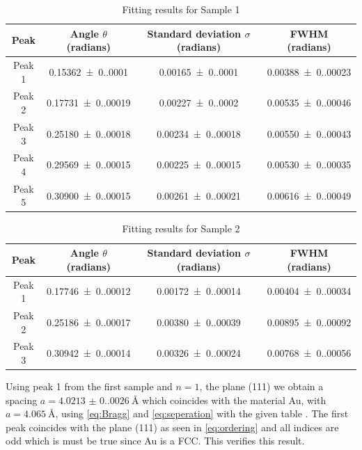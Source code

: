 \begin{table}[H]
    \centering
    \caption{Fitting results for Sample 1}
    \begin{tabular}{cccc}
    \toprule
    Peak & Angle $\theta$ (radians) & Standard deviation $\sigma$ (radians) & FWHM (radians) \\
    \midrule
    Peak 1 & \num{0.15362(0.00010)}{} & \num{0.00165(0.00010)} & \num{0.00388(0.00023)}{} \\
    Peak 2 & \num{0.17731(0.00019)}{} & \num{0.00227(0.00020)}{} & \num{0.00535(0.00046)}{} \\
    Peak 3 & \num{0.25180(0.00018)}{} & \num{0.00234(0.00018)}{} & \num{0.00550(0.00043)}{} \\
    Peak 4 & \num{0.29569(0.00015)}{} & \num{0.00225(0.00015)}{} & \num{0.00530(0.00035)}{} \\
    Peak 5 & \num{0.30900(0.00015)}{} & \num{0.00261(0.00021)}{} & \num{0.00616(0.00049)}{} \\
    \bottomrule
    \end{tabular}
    \label{tab:sample1}
\end{table}

\begin{table}[H]
    \centering
    \caption{Fitting results for Sample 2}
    \begin{tabular}{cccc}
    \toprule
    Peak & Angle $\theta$ (radians) & Standard deviation $\sigma$ (radians) & FWHM (radians) \\
    \midrule
    Peak 1 & \num{0.17746(0.00012)}{} & \num{0.00172(0.00014)}{} & \num{0.00404(0.00034)}{} \\
    Peak 2 & \num{0.25186(0.00017)}{} & \num{0.00380(0.00039)}{} & \num{0.00895(0.00092)}{} \\
    Peak 3 & \num{0.30942(0.00014)}{} & \num{0.00326(0.00024)}{} & \num{0.00768(0.00056)}{} \\
    \bottomrule
    \end{tabular}
    \label{tab:sample2}
\end{table}


Using peak 1 from the first sample and $n=1$, the plane (111) we obtain a spacing $a=\SI{4.0213(0.0026)}{\angstrom}$ which coincides with the material Au, with $a=\SI{4.065}{\angstrom}$, using \autoref{eq:Bragg} and \autoref{eq:seperation} with the given table \cite{solidstatephysics2025}. The first peak coincides with the plane (111) as seen in \autoref{eq:ordering} and all indices are odd which is must be true since Au is a FCC. This verifies this result. 

